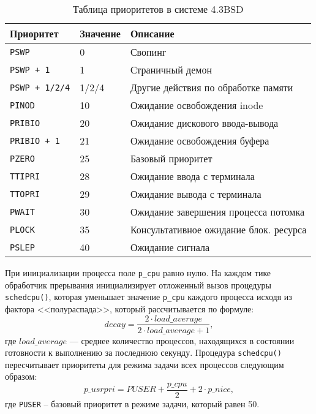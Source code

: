 \begin{table}[ht!]
	\caption{Таблица приоритетов в системе 4.3BSD}
	\begin{center}
		\begin{tabular}{ |l|l|p{}|  }
			\hline
			\textbf{Приоритет} & \textbf{Значение} & \textbf{Описание} \\ \hline
			\texttt{PSWP} & 0 & Свопинг \\
			\texttt{PSWP + 1} & 1 & Страничный демон \\
			\texttt{PSWP + 1/2/4} & 1/2/4 & Другие действия по обработке памяти \\
			\texttt{PINOD} & 10 & Ожидание освобождения inode \\
			\texttt{PRIBIO} & 20 & Ожидание дискового ввода-вывода \\
			\texttt{PRIBIO + 1} & 21 & Ожидание освобождения буфера \\
			\texttt{PZERO} & 25 & Базовый приоритет \\
			\texttt{TTIPRI} & 28 & Ожидание ввода с терминала \\
			\texttt{TTOPRI} & 29 & Ожидание вывода с терминала \\ 
			\texttt{PWAIT} & 30 & Ожидание завершения процесса потомка \\
			\texttt{PLOCK} & 35 & Консультативное ожидание блок. ресурса \\
			\texttt{PSLEP} & 40 & Ожидание сигнала \\
			\hline
		\end{tabular}
		\label{bsd}
	\end{center}
\end{table}

\FloatBarrier

При инициализации процесса поле \texttt{p\_cpu} равно нулю. На каждом тике обработчик прерывания инициализирует отложенный вы­зов процедуры \texttt{schedcpu()}, которая уменьшает значение \texttt{p\_cpu} каждого процесса
исходя из фактора <<полураспада>>, который рассчитывается по формуле:
\begin{equation}
	decay = \frac{2 \cdot load\_average}{2 \cdot load\_average + 1},
\end{equation}
где $load\_average$ --- среднее количество процессов, находящихся в состоянии готовности к выполнению за последнюю секунду. 
Процедура \texttt{schedcpu()} пересчитывает приоритеты для режима задачи всех процессов следующим образом:
\begin{equation}
	p\_usrpri = PUSER + \frac{p\_cpu}{2} + 2 \cdot p\_nice,
\end{equation}
где \texttt{PUSER} -- базовый приоритет в режиме задачи, который равен 50.

